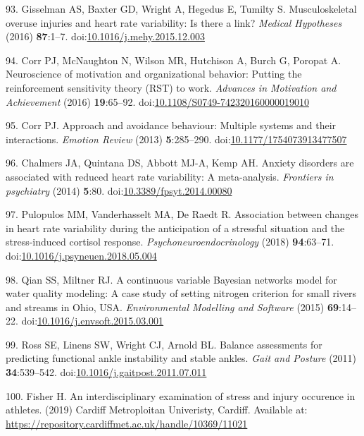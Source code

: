 \documentclass[
  english,
  man]{apa6}
\newenvironment{cslreferences}%
  {}%
  {\par}
\begin{document}
\begin{cslreferences}
\leavevmode\hypertarget{ref-Gisselman2016}{}%
93. Gisselman AS, Baxter GD, Wright A, Hegedus E, Tumilty S. Musculoskeletal overuse injuries and heart rate variability: Is there a link? \emph{Medical Hypotheses} (2016) \textbf{87}:1--7. doi:\href{https://doi.org/10.1016/j.mehy.2015.12.003}{10.1016/j.mehy.2015.12.003}

\leavevmode\hypertarget{ref-Corr2016b}{}%
94. Corr PJ, McNaughton N, Wilson MR, Hutchison A, Burch G, Poropat A. Neuroscience of motivation and organizational behavior: Putting the reinforcement sensitivity theory (RST) to work. \emph{Advances in Motivation and Achievement} (2016) \textbf{19}:65--92. doi:\href{https://doi.org/10.1108/S0749-742320160000019010}{10.1108/S0749-742320160000019010}

\leavevmode\hypertarget{ref-Corr2013}{}%
95. Corr PJ. Approach and avoidance behaviour: Multiple systems and their interactions. \emph{Emotion Review} (2013) \textbf{5}:285--290. doi:\href{https://doi.org/10.1177/1754073913477507}{10.1177/1754073913477507}

\leavevmode\hypertarget{ref-Chalmers2014}{}%
96. Chalmers JA, Quintana DS, Abbott MJ-A, Kemp AH. Anxiety disorders are associated with reduced heart rate variability: A meta-analysis. \emph{Frontiers in psychiatry} (2014) \textbf{5}:80. doi:\href{https://doi.org/10.3389/fpsyt.2014.00080}{10.3389/fpsyt.2014.00080}

\leavevmode\hypertarget{ref-Pulopulos2018}{}%
97. Pulopulos MM, Vanderhasselt MA, De Raedt R. Association between changes in heart rate variability during the anticipation of a stressful situation and the stress-induced cortisol response. \emph{Psychoneuroendocrinology} (2018) \textbf{94}:63--71. doi:\href{https://doi.org/10.1016/j.psyneuen.2018.05.004}{10.1016/j.psyneuen.2018.05.004}

\leavevmode\hypertarget{ref-Qian2015}{}%
98. Qian SS, Miltner RJ. A continuous variable Bayesian networks model for water quality modeling: A case study of setting nitrogen criterion for small rivers and streams in Ohio, USA. \emph{Environmental Modelling and Software} (2015) \textbf{69}:14--22. doi:\href{https://doi.org/10.1016/j.envsoft.2015.03.001}{10.1016/j.envsoft.2015.03.001}

\leavevmode\hypertarget{ref-Ross2011}{}%
99. Ross SE, Linens SW, Wright CJ, Arnold BL. Balance assessments for predicting functional ankle instability and stable ankles. \emph{Gait and Posture} (2011) \textbf{34}:539--542. doi:\href{https://doi.org/10.1016/j.gaitpost.2011.07.011}{10.1016/j.gaitpost.2011.07.011}

\leavevmode\hypertarget{ref-Fisher2019}{}%
100. Fisher H. An interdisciplinary examination of stress and injury occurence in athletes. (2019) Cardiff Metroploitan Univeristy, Cardiff. Available at: \url{https://repository.cardiffmet.ac.uk/handle/10369/11021}
\end{cslreferences}

\endgroup
\end{document}
